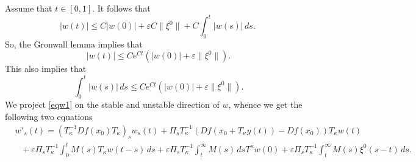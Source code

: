 \documentclass[11pt, leqno]{amsart}
\theoremstyle{definition}
\begin{document}
Assume that $t\in [0,1]$. It follows that
$$
|w(t)| \leq C |w(0)|+\varepsilon C\|\xi^0\| + C\int_0^t |w(s)|\, ds. \
$$
So, the Gronwall lemma implies that
\begin{equation}\label{107}
|w(t)|\leq Ce^{Ct} (|w(0)|+\varepsilon \|\xi^0\|).
\end{equation}
This also implies that
\begin{equation}\label{107b}
\int_0^t|w(s)|\, ds \leq C e^{Ct} (|w(0)|+\varepsilon \|\xi^0\|).
\end{equation}
We project \eqref{eqw1} on the stable and unstable direction of $w$, whence we get the following two equations
\begin{align}
	& w'_s(t) = (T_\kappa^{-1}D f(x_0) T_\kappa)_s w_s(t) + \Pi_sT_\kappa^{-1} (Df(x_0 + T_\kappa y(t)) - D f(x_0)) T_\kappa w(t) \nonumber\\
	& \ \ \  + \varepsilon \Pi_sT_\kappa^{-1}\int_0^t M(s) T_\kappa w(t-s)\, ds  + \varepsilon \Pi_sT_\kappa^{-1}\int_t^\infty M(s) \, dsT^\kappa w(0) + \varepsilon \Pi_sT_\kappa^{-1}\int_t^\infty M(s) \xi^0(s-t)\, ds.\label{eqw1_s}
\end{align}
\end{document}
